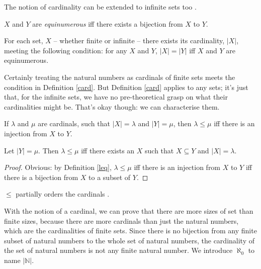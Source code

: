The notion of cardinality can be extended to infinite sets too \citep[chs. 3, 6]{macsetthl}. \begin{definition}[Equinumerosity]
	$X$ and $Y$ are \emph{equinumerous} iff there exists a bijection from $X$ to $Y$.
\end{definition}
\begin{definition}[Cardinality]\label{card}
	For each set, $X$ – whether finite or infinite – there exists its cardinality, $|X|$, meeting the following condition: for any $X$ and $Y$, $|X|=|Y|$ iff $X$ and $Y$ are equinumerous.
\end{definition}
Certainly treating the natural numbers as cardinals of finite sets meets the condition in Definition \ref{card}. But Definition \ref{card} applies to any sets; it's just that, for the infinite sets, we have no pre-theoretical grasp on what their cardinalities might be. That's okay though: we can characterise them. \begin{definition}[$\leq$]\label{leq}
	If $\lambda$ and $\mu$ are cardinals, such that $|X|=\lambda$ and $|Y|=\mu$, then $\lambda \leq \mu$ iff there is an injection from $X$ to $Y$. 
\end{definition}
\begin{theorem}
	Let $|Y|=\mu$. Then $\lambda\leq\mu$ iff there exists an $X$ such that $X \subseteq Y$ and $|X|=\lambda$. \begin{proof}
		Obvious: by Definition \ref{leq}, $\lambda\leq\mu$ iff there is an injection from $X$ to $Y$ iff there is a bijection from $X$ to a subset of $Y$.\label{cardleq}
	\end{proof}
\end{theorem}
\begin{theorem}
	$\leq$ partially orders the cardinals \citep[38–41]{macsetthl}. 
\end{theorem}

With the notion of a cardinal, we can prove that there are more sizes of set than finite sizes, because there are more cardinals than just the natural numbers, which are the cardinalities of finite sets. Since there is no bijection from any finite subset of natural numbers to the whole set of natural numbers, the cardinality of the set of natural numbers is not any finite natural number. We introduce $\aleph_{0}$ to name $|\mathbb{N}|$. 

